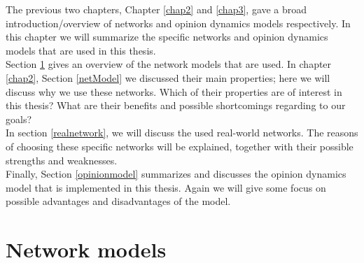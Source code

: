 \documentclass[11 pt , letterpaper , twoside , openright]{book}
\begin{document}
The previous two chapters, Chapter \ref{chap2} and \ref{chap3}, gave a broad introduction/overview of networks and opinion dynamics models respectively. In this chapter we will summarize the specific networks and opinion dynamics models that are used in this thesis. \\
\newline
Section \ref{networkmodel} gives an overview of the network models that are used. In chapter \ref{chap2}, Section \ref{netModel} we discussed their main properties; here we will discuss why we use these networks. Which of their properties are of interest in this thesis? What are their benefits and possible shortcomings regarding to our goals?\\
\newline
In section \ref{realnetwork}, we will discuss the used real-world networks. The reasons of choosing these specific networks will be explained, together with their possible strengths and weaknesses.\\ %
\newline
Finally, Section \ref{opinionmodel} summarizes and discusses the opinion dynamics model that is implemented in this thesis. Again we will give some focus on possible advantages and disadvantages of the model.


\section{Network models}\label{networkmodel}
\end{document}
